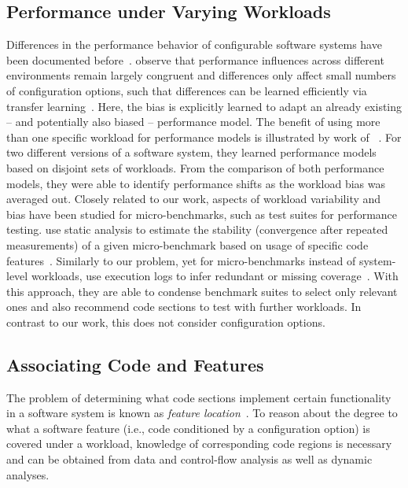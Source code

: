 \subsection{Performance under Varying Workloads}
Differences in the performance behavior of configurable software systems have been documented before~\cite{jamishidi_transfer_2017,alves_sampling_2020}. \citeauthor{jamishidi_transfer_2017} observe that performance influences across different environments remain largely congruent and differences only affect small numbers of configuration options, such that differences can be learned efficiently via transfer learning~\cite{jamishidi_transfer_2017,jamshidi_learning_2018,jamshidi_transfer_gp_2017,ding_bayesian_2020}. Here, the bias is explicitly learned to adapt an already existing – and potentially also biased -- performance model. The benefit of using more than one specific workload for performance models is illustrated by work of \citeauthor{liao_2020_using_emse}~\cite{liao_2020_using_emse}. For two different versions of a software system, they learned performance models based on disjoint sets of workloads. From the comparison of both performance models, they were able to identify performance shifts as the workload bias was averaged out.
Closely related to our work, aspects of workload variability and bias have been studied for micro-benchmarks, such as test suites for performance testing. \citeauthor{laaber_emse_2021} use static analysis to estimate the stability (convergence after repeated measurements) of a given micro-benchmark based on usage of specific code features~\cite{laaber_emse_2021}. Similarly to our problem, yet for micro-benchmarks instead of system-level workloads, \citeauthor{grambow_peerj_2021} use execution logs to infer redundant or missing coverage~\cite{grambow_peerj_2021}. With this approach, they are able to condense benchmark suites to select only relevant ones and also recommend code sections to test with further workloads. In contrast to our work, this does not consider configuration options.

\subsection{Associating Code and Features}\label{sec:feature_location}
The problem of determining what code sections implement certain functionality in a software system is known as \emph{feature location}~\cite{rubin_feature_2013}. To reason about the degree to what a software feature (i.e., code conditioned by a configuration option) is covered under a workload, knowledge of corresponding code regions is necessary and can be obtained from data and control-flow analysis as well as dynamic analyses.

